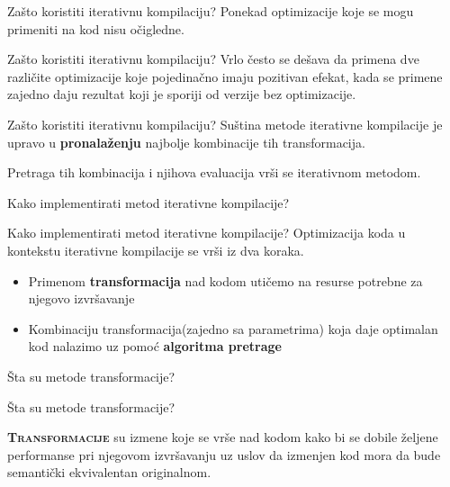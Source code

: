 \documentclass[10pt]{beamer}
\begin{document}
\begin{frame}[fragile]{Zašto koristiti iterativnu kompilaciju?}
  Ponekad optimizacije koje se mogu primeniti na kod nisu očigledne.
\end{frame}

\begin{frame}[fragile]{Zašto koristiti iterativnu kompilaciju?}
  Vrlo često se dešava da primena dve različite optimizacije koje pojedinačno imaju pozitivan efekat, kada se primene zajedno daju rezultat koji je sporiji od verzije bez optimizacije.
\end{frame}

\begin{frame}[fragile]{Zašto koristiti iterativnu kompilaciju?}
  Suština metode iterativne kompilacije je upravo u \textbf{pronalaženju} najbolje kombinacije tih transformacija.
  
  \vspace{5mm} %
  
  Pretraga tih kombinacija i njihova evaluacija vrši se iterativnom metodom.
\end{frame}

\begin{frame}[standout]
  Kako implementirati metod iterativne kompilacije?
\end{frame}
\begin{frame}[fragile]{Kako implementirati metod iterativne kompilacije?}
  Optimizacija koda u kontekstu iterativne kompilacije se vrši iz dva koraka.
  \begin{itemize}[<+- | alert@+>]
    \item Primenom \textbf{transformacija} nad kodom utičemo na resurse potrebne za njegovo izvršavanje
    \item Kombinaciju transformacija(zajedno sa parametrima) koja daje optimalan kod nalazimo uz pomoć \textbf{algoritma pretrage}
  \end{itemize}
\end{frame}

\begin{frame}[standout]
  Šta su metode transformacije?
\end{frame}
\begin{frame}[fragile]{Šta su metode transformacije?}

  {\textbf{\textsc{Transformacije}}\xspace}  su izmene koje se vrše nad kodom kako bi se dobile željene performanse pri njegovom izvršavanju uz uslov da izmenjen kod mora da bude semantički ekvivalentan originalnom.
\end{frame}
\end{document}
